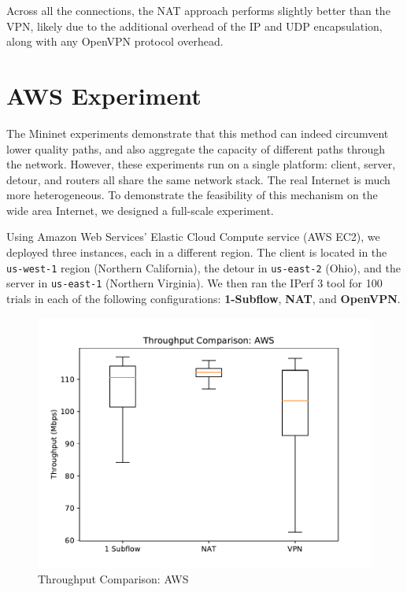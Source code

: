 \documentclass{cwru}
\begin{document}
Across all the connections, the NAT approach performs slightly better than the
VPN, likely due to the additional overhead of the IP and UDP encapsulation,
along with any OpenVPN protocol overhead.

\section{AWS Experiment}

The Mininet experiments demonstrate that this method can indeed circumvent lower
quality paths, and also aggregate the capacity of different paths through the
network. However, these experiments run on a single platform: client, server,
detour, and routers all share the same network stack. The real Internet is much
more heterogeneous. To demonstrate the feasibility of this mechanism on the wide
area Internet, we designed a full-scale experiment.

Using Amazon Web Services' Elastic Cloud Compute service (AWS EC2), we deployed
three instances, each in a different region. The client is located in the
\texttt{us-west-1} region (Northern California), the detour in
\texttt{us-east-2} (Ohio), and the server in \texttt{us-east-1} (Northern
Virginia). We then ran the IPerf 3 tool for 100 trials in each of the following
configurations: \textbf{1-Subflow}, \textbf{NAT}, and \textbf{OpenVPN}.

\begin{figure}
  \centering
  \includegraphics[height=0.45\textheight]{figures/aws.pdf}
  \caption{Throughput Comparison: AWS}
  \label{fig:aws}
\end{figure}
\end{document}
